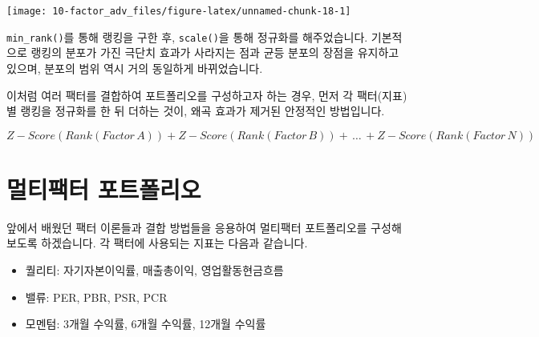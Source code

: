 \documentclass[12pt,]{book}
\providecommand{\tightlist}{%
  \setlength{\itemsep}{0pt}\setlength{\parskip}{0pt}}
\begin{document}
\begin{center}\texttt{[image: 10-factor\_adv\_files/figure-latex/unnamed-chunk-18-1]} \end{center}

\texttt{min\_rank()}를 통해 랭킹을 구한 후, \texttt{scale()}을 통해 정규화를 해주었습니다. 기본적으로 랭킹의 분포가 가진 극단치 효과가 사라지는 점과 균등 분포의 장점을 유지하고 있으며, 분포의 범위 역시 거의 동일하게 바뀌었습니다.

이처럼 여러 팩터를 결합하여 포트폴리오를 구성하고자 하는 경우, 먼저 각 팩터(지표) 별 랭킹을 정규화를 한 뒤 더하는 것이, 왜곡 효과가 제거된 안정적인 방법입니다.

\begin{scriptsize}
\begin{equation*} 
Z - Score(Rank(Factor\,A)) + Z - Score(Rank(Factor\,B)) +\,\dots\,+ Z - Score(Rank(Factor\,N))
\end{equation*} 
\end{scriptsize}

\hypertarget{section-67}{%
\section{멀티팩터 포트폴리오}\label{section-67}}

앞에서 배웠던 팩터 이론들과 결합 방법들을 응용하여 멀티팩터 포트폴리오를 구성해보도록 하겠습니다. 각 팩터에 사용되는 지표는 다음과 같습니다.

\begin{itemize}
\tightlist
\item
  퀄리티: 자기자본이익률, 매출총이익, 영업활동현금흐름
\item
  밸류: PER, PBR, PSR, PCR
\item
  모멘텀: 3개월 수익률, 6개월 수익률, 12개월 수익률
\end{itemize}
\end{document}

